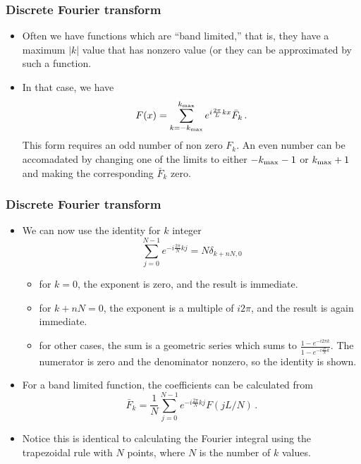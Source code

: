 \documentclass{beamer}
\begin{document}
\begin{frame}
\frametitle{Discrete Fourier transform}
\begin{itemize}
\item
Often we have functions which are ``band limited,'' that is, they
have a maximum $|k|$ value that has nonzero value (or they can be
approximated by such a function.

\item
In that case, we have
\begin{equation}
F(x) = \sum_{k=-k_{\rm max}}^{k_{\rm max}} e^{i \frac{2\pi}{L} kx  } \bar F_k\,.
\end{equation}
This form requires an odd number of non zero $F_k$. An even number can
be accomadated by changing one of the limits to either $-k_{\rm max}-1$ or
$k_{\rm max}+1$ and making the corresponding $\bar F_k$ zero.
\end{itemize}
\end{frame}
\begin{frame}
\frametitle{Discrete Fourier transform}
\begin{itemize}
\item
We can now use the identity for $k$ integer
\begin{equation}
\sum_{j=0}^{N-1} e^{-i \frac{2\pi}{N} k j} = N \delta_{k+nN,0}
\end{equation}
\begin{itemize}
\item
for $k=0$, the exponent is zero, and the result is immediate.
\item
for $k + n N = 0$, the exponent is a multiple of $i 2\pi$, and the result
is again immediate.
\item
for other cases, the sum is a geometric series which sums to
$\frac{1-e^{-i 2\pi k}}{1-e^{-i\frac{2\pi}{N} k}}$.
The numerator is zero and the denominator nonzero, so the identity is shown.
\end{itemize}

\item
For a band limited function, the coefficients can be calculated from
\begin{equation}
\bar F_k = \frac{1}{N} \sum_{j=0}^{N-1} e^{-i\frac{2\pi}{N} k j} F(j L/N) \,.
\end{equation}
\item
Notice this is identical to calculating the Fourier integral using
the trapezoidal rule with $N$ points, where $N$ is the number of
$k$ values.
\end{itemize}
\end{frame}
\end{document}
